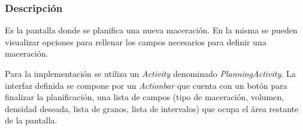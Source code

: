         \subsubsection{Descripción}
                \par Es la pantalla donde se planifica una nueva maceración. En la misma se pueden visualizar opciones para rellenar los campos necesarios para definir una maceración.
                
                \par Para la implementación se utiliza un \textit{Activity} denominado \textit{PlanningActivity}. La interfaz definida se compone por un \textit{Actionbar} que cuenta con un botón para finalizar la planificación, una lista de campos (tipo de maceración, volumen, densidad deseada, lista de granos, lista de intervalos) que ocupa el área restante de la pantalla. 
                
